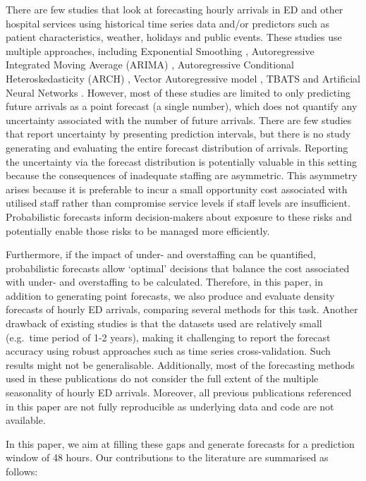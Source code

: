 \documentclass[]{elsarticle} %
\begin{document}
There are few studies that look at forecasting hourly arrivals in ED and other hospital services using historical time series data and/or predictors such as patient characteristics, weather, holidays and public events. These studies use multiple approaches, including Exponential Smoothing \citep{SvetunkovAdam}, Autoregressive Integrated Moving Average (ARIMA) \citep{hyndman2021forecasting}, Autoregressive Conditional Heteroskedasticity (ARCH) \citep{bollerslev1994arch}, Vector Autoregressive model \citep{lutkepohl2013vector}, TBATS \citep{de2011forecasting} and Artificial Neural Networks \citep{hyndman2021forecasting}. However, most of these studies are limited to only predicting future arrivals as a point forecast (a single number), which does not quantify any uncertainty associated with the number of future arrivals. There are few studies that report uncertainty by presenting prediction intervals, but there is no study generating and evaluating the entire forecast distribution of arrivals. Reporting the uncertainty via the forecast distribution is potentially valuable in this setting because the consequences of inadequate staffing are asymmetric. This asymmetry arises because it is preferable to incur a small opportunity cost associated with utilised staff rather than compromise service levels if staff levels are insufficient. Probabilistic forecasts inform decision-makers about exposure to these risks and potentially enable those risks to be managed more efficiently.

Furthermore, if the impact of under- and overstaffing can be quantified, probabilistic forecasts allow `optimal' decisions that balance the cost associated with under- and overstaffing to be calculated. Therefore, in this paper, in addition to generating point forecasts, we also produce and evaluate density forecasts of hourly ED arrivals, comparing several methods for this task. Another drawback of existing studies is that the datasets used are relatively small (e.g.~time period of 1-2 years), making it challenging to report the forecast accuracy using robust approaches such as time series cross-validation. Such results might not be generalisable. Additionally, most of the forecasting methods used in these publications do not consider the full extent of the multiple seasonality of hourly ED arrivals. Moreover, all previous publications referenced in this paper are not fully reproducible as underlying data and code are not available.

In this paper, we aim at filling these gaps and generate forecasts for a prediction window of 48 hours. Our contributions to the literature are summarised as follows:
\end{document}
